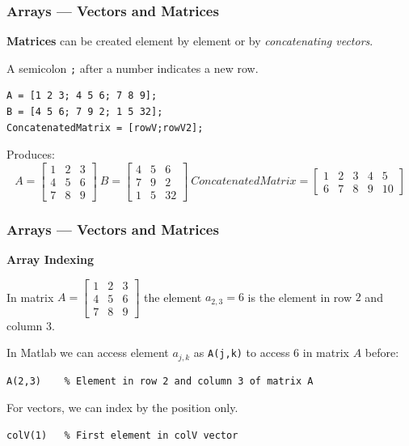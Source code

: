 \documentclass[11pt,xcolor={svgnames},aspectratio=169,usepdftitle=false]{beamer}
\let\toneitemize\itemize
\let\ttwoitemize\enditemize
\renewenvironment{itemize}{\toneitemize\addtolength{\itemsep}{1.35\baselineskip}}{\ttwoitemize}
\begin{document}
\begin{frame}[fragile]
    \frametitle{Arrays --- Vectors and Matrices}
\begin{itemize}
    \item \alert{\textbf{Matrices}} can be created element by element or by \textit{concatenating vectors}.
    \item A semicolon \verb+;+ after a number indicates a new row.
\begin{lstlisting}
A = [1 2 3; 4 5 6; 7 8 9];
B = [4 5 6; 7 9 2; 1 5 32];
ConcatenatedMatrix = [rowV;rowV2];
\end{lstlisting}
    \item Produces:
    \[
    A = \begin{bmatrix}
    1 & 2 & 3 \\
    4 & 5 & 6 \\
    7 & 8 & 9 
    \end{bmatrix} \ 
    B = \begin{bmatrix}
    4 & 5 & 6 \\
    7 & 9 & 2 \\
    1 & 5 & 32
    \end{bmatrix} \ 
    ConcatenatedMatrix = \begin{bmatrix}
    1 & 2 & 3 & 4 & 5 \\
    6 & 7 & 8 & 9 & 10
    \end{bmatrix}
    \]
\end{itemize}
\end{frame}

\begin{frame}[fragile]
    \frametitle{Arrays --- Vectors and Matrices}
\alert{\textbf{Array Indexing}}
    \begin{itemize}
        \item In matrix $A = \begin{bmatrix}
            1 & 2 & 3 \\
            4 & 5 & 6 \\
            7 & 8 & 9 
            \end{bmatrix}$ the element $a_{2,3} = 6$ is the element in row $2$ and column $3$.
        \item In Matlab we can access element $a_{j,k}$ as \verb;A(j,k); to access $6$ in matrix $A$ before:
\begin{lstlisting}
A(2,3)    % Element in row 2 and column 3 of matrix A
\end{lstlisting}
        \item For vectors, we can index by the position only.
\begin{lstlisting}
colV(1)   % First element in colV vector
\end{lstlisting}
    \end{itemize}
\end{frame}
\end{document}
